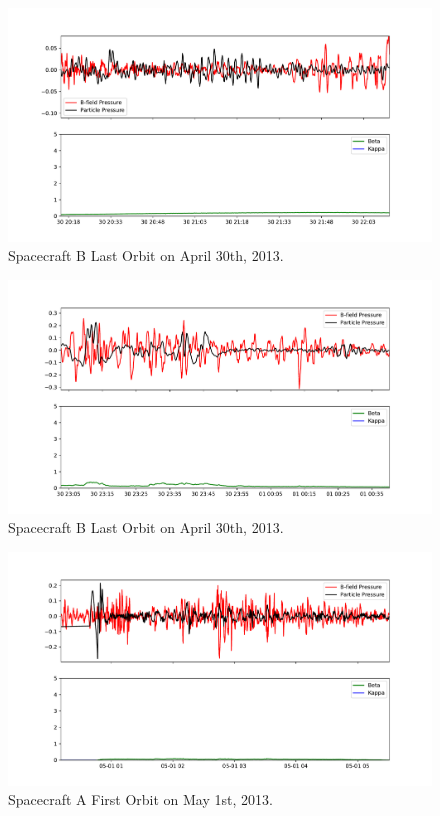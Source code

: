 \documentclass{report}
\begin{document}
\begin{figure}
\includegraphics[scale=.45]{B_Orbit1_1.pdf}
\caption{Spacecraft B Last Orbit on April 30th, 2013.}
\end{figure}

\begin{figure}
\includegraphics[scale=.45]{B_Orbit1_2.pdf}
\caption{Spacecraft B Last Orbit on April 30th, 2013.}
\end{figure}

\begin{figure}
\includegraphics[scale=.45]{A_Orbit1.pdf}
\caption{Spacecraft A First Orbit on May 1st, 2013.}
\end{figure}
\end{document}
